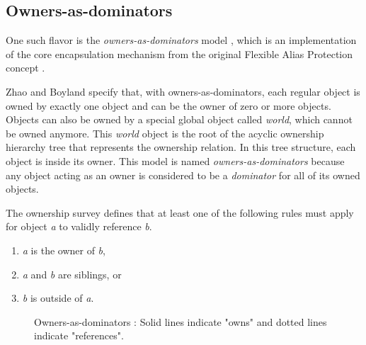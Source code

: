 \documentclass[sigplan,11pt,nonacm]{acmart}
\begin{document}
\subsection{Owners-as-dominators}
\label{sec:owners-as-dominators}

One such flavor is the \emph{owners-as-dominators} model \cite{ownership-types-survey}, which is an implementation of the core encapsulation mechanism from the original Flexible Alias Protection concept \cite{flexible-alias-protection}.

Zhao and Boyland \cite{permission-ownership-types} specify that, with owners-as-dominators, each regular object is owned by exactly one object and can be the owner of zero or more objects.
Objects can also be owned by a special global object called \emph{world}, which cannot be owned anymore.
This \emph{world} object is the root of the acyclic ownership hierarchy tree that represents the ownership relation.
In this tree structure, each object is inside its owner.
This model is named \emph{owners-as-dominators} because any object acting as an owner is considered to be a \emph{dominator} for all of its owned objects.

The ownership survey \cite{ownership-types-survey} defines that at least one of the following rules must apply for object \emph{a} to validly reference \emph{b}.
\begin{enumerate}
  \item \emph{a} is the owner of \emph{b},
  \item \emph{a} and \emph{b} are siblings, or
  \item \emph{b} is outside of \emph{a}.
\end{enumerate}

\begin{figure}

  \caption{Owners-as-dominators \cite{flexible-alias-protection}: Solid lines indicate "owns" and dotted lines indicate "references".}
  \label{fig:owners-as-dominators}
\end{figure}
\end{document}

